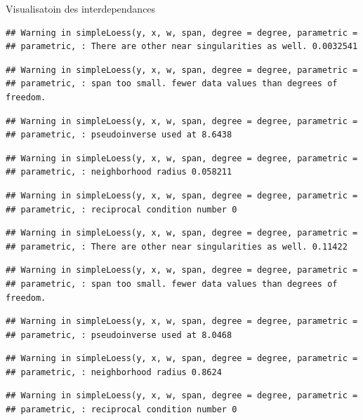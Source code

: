\documentclass[11pt,ignorenonframetext,]{beamer}
\begin{document}
\begin{frame}[fragile]{Visualisatoin des interdependances}
\begin{verbatim}
## Warning in simpleLoess(y, x, w, span, degree = degree, parametric =
## parametric, : There are other near singularities as well. 0.0032541
\end{verbatim}

\begin{verbatim}
## Warning in simpleLoess(y, x, w, span, degree = degree, parametric =
## parametric, : span too small. fewer data values than degrees of freedom.
\end{verbatim}

\begin{verbatim}
## Warning in simpleLoess(y, x, w, span, degree = degree, parametric =
## parametric, : pseudoinverse used at 8.6438
\end{verbatim}

\begin{verbatim}
## Warning in simpleLoess(y, x, w, span, degree = degree, parametric =
## parametric, : neighborhood radius 0.058211
\end{verbatim}

\begin{verbatim}
## Warning in simpleLoess(y, x, w, span, degree = degree, parametric =
## parametric, : reciprocal condition number 0
\end{verbatim}

\begin{verbatim}
## Warning in simpleLoess(y, x, w, span, degree = degree, parametric =
## parametric, : There are other near singularities as well. 0.11422
\end{verbatim}

\begin{verbatim}
## Warning in simpleLoess(y, x, w, span, degree = degree, parametric =
## parametric, : span too small. fewer data values than degrees of freedom.
\end{verbatim}

\begin{verbatim}
## Warning in simpleLoess(y, x, w, span, degree = degree, parametric =
## parametric, : pseudoinverse used at 8.0468
\end{verbatim}

\begin{verbatim}
## Warning in simpleLoess(y, x, w, span, degree = degree, parametric =
## parametric, : neighborhood radius 0.8624
\end{verbatim}

\begin{verbatim}
## Warning in simpleLoess(y, x, w, span, degree = degree, parametric =
## parametric, : reciprocal condition number 0
\end{verbatim}


\end{frame}
\end{document}
